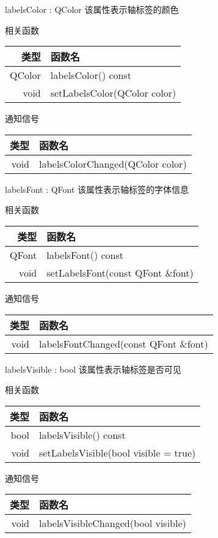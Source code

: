 labelsColor : QColor 该属性表示轴标签的颜色

相关函数

\begin{tabular}{|r|l|}
\hline
类型&函数名\\ 
\hline
QColor	&labelsColor() const\\
\hline
void &setLabelsColor(QColor color)\\
\hline
\end{tabular}

通知信号

\begin{tabular}{|r|l|}
\hline
类型&函数名\\ 
\hline
void &	labelsColorChanged(QColor color)\\
\hline
\end{tabular}

labelsFont : QFont 该属性表示轴标签的字体信息

相关函数

\begin{tabular}{|r|l|}
\hline
类型&函数名\\ 
\hline
QFont	&labelsFont() const\\
\hline
void	&setLabelsFont(const QFont \&font)\\
\hline
\end{tabular}

通知信号

\begin{tabular}{|r|l|}
\hline
类型&函数名\\ 
\hline
void	&labelsFontChanged(const QFont \&font)\\
\hline
\end{tabular}

labelsVisible : bool 该属性表示轴标签是否可见

相关函数

\begin{tabular}{|r|l|}
\hline
类型&函数名\\ 
\hline
bool&	labelsVisible() const\\
\hline
void	&setLabelsVisible(bool visible = true)\\
\hline
\end{tabular}

通知信号

\begin{tabular}{|r|l|}
\hline
类型&函数名\\ 
\hline
void	&labelsVisibleChanged(bool visible)\\
\hline
\end{tabular}

